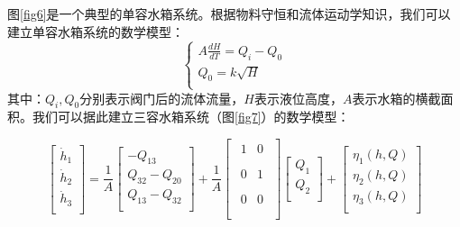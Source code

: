\documentclass{WHUMaster}   %
\begin{document}
图\ref{fig6}是一个典型的单容水箱系统。根据物料守恒和流体运动学知识，我们可以建立单容水箱系统的数学模型：
\begin{equation}
\begin{cases}
A\frac{dH}{dT}=Q_i-Q_0\\
Q_0=k\sqrt{H}\\
\end{cases}
	\label{water1}
\end{equation}
其中：$Q_i,Q_0$分别表示阀门后的流体流量，$H$表示液位高度，$A$表示水箱的横截面积。我们可以据此建立三容水箱系统（图\ref{fig7}）的数学模型：

$$
\left[ \begin{array}{c}
\dot{h}_1\\
\dot{h}_2\\
\dot{h}_3\\
\end{array} \right] =\frac{1}{A}\left[ \begin{array}{c}
-Q_{13}\\
Q_{32}-Q_{20}\\
Q_{13}-Q_{32}\\
\end{array} \right] +\frac{1}{A}\left[ \begin{array}{c}
\begin{matrix}
1&		0\\
\end{matrix}\\
\begin{matrix}
0&		1\\
\end{matrix}\\
\begin{matrix}
0&		0\\
\end{matrix}\\
\end{array} \right] \left[ \begin{array}{c}
Q_1\\
Q_2\\
\end{array} \right] +\left[ \begin{array}{c}
\eta _1\left( h,Q \right)\\
\eta _2\left( h,Q \right)\\
\eta _3\left( h,Q \right)\\
\end{array} \right] 
$$
\end{document}
